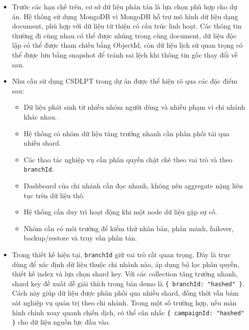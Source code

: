 \documentclass[12pt,a4paper]{article}
\begin{document}
\begin{itemize}
\begin{itemize}
\item \textbf{Khó mở rộng dữ liệu:} các collection như \texttt{contributions}, \texttt{aid\_distributions} và \texttt{activity\_logs} có tốc độ tăng trưởng cao, nếu lưu tập trung sẽ gây áp lực lớn cho lưu trữ, index và truy vấn.
\item \textbf{Rủi ro mất sẵn sàng:} nếu máy chủ chính gặp sự cố, toàn bộ nghiệp vụ tiếp nhận đóng góp, phân phối hỗ trợ và thống kê có thể bị gián đoạn.
\item \textbf{Khó kiểm soát dữ liệu theo chi nhánh:} chi nhánh chỉ được thao tác trên dữ liệu của mình, nhưng trụ sở chính lại cần xem toàn hệ thống. Nếu không thiết kế theo phạm vi \texttt{branchId}, việc phân quyền và lọc dữ liệu sẽ khó kiểm soát.
\item \textbf{Khó đáp ứng yêu cầu thực hành CSDLPT:} mô hình tập trung không thể hiện rõ các nội dung quan trọng như sharding, replication, distributed query, localization và failover.
\end{itemize}
\item Trước các hạn chế trên, cơ sở dữ liệu phân tán là lựa chọn phù hợp cho dự án. Hệ thống sử dụng MongoDB vì MongoDB hỗ trợ mô hình dữ liệu dạng document, phù hợp với dữ liệu từ thiện có cấu trúc linh hoạt. Các thông tin thường đi cùng nhau có thể được nhúng trong cùng document, dữ liệu độc lập có thể được tham chiếu bằng ObjectId, còn dữ liệu lịch sử quan trọng có thể được lưu bằng snapshot để tránh sai lệch khi thông tin gốc thay đổi về sau.
\item Nhu cầu sử dụng CSDLPT trong dự án được thể hiện rõ qua các đặc điểm sau:
\begin{itemize}
\item Dữ liệu phát sinh từ nhiều nhóm người dùng và nhiều phạm vi chi nhánh khác nhau.
\item Hệ thống có nhóm dữ liệu tăng trưởng nhanh cần phân phối tải qua nhiều shard.
\item Các thao tác nghiệp vụ cần phân quyền chặt chẽ theo vai trò và theo \texttt{branchId}.
\item Dashboard của chi nhánh cần đọc nhanh, không nên aggregate nặng liên tục trên dữ liệu thô.
\item Hệ thống cần duy trì hoạt động khi một node dữ liệu gặp sự cố.
\item Nhóm cần có môi trường để kiểm thử nhân bản, phân mảnh, failover, backup/restore và truy vấn phân tán.
\end{itemize}
\item Trong thiết kế hiện tại, \texttt{branchId} giữ vai trò rất quan trọng. Đây là trục dùng để xác định dữ liệu thuộc chi nhánh nào, áp dụng bộ lọc phân quyền, thiết kế index và lựa chọn shard key. Với các collection tăng trưởng nhanh, shard key đề xuất dễ giải thích trong bản demo là \texttt{\{ branchId: "hashed" \}}. Cách này giúp dữ liệu được phân phối qua nhiều shard, đồng thời vẫn bám sát nghiệp vụ quản trị theo chi nhánh. Trong một số trường hợp, nếu màn hình chính xoay quanh chiến dịch, có thể cân nhắc \texttt{\{ campaignId: "hashed" \}} cho dữ liệu nguồn lực đầu vào.

\end{itemize}
\end{document}
